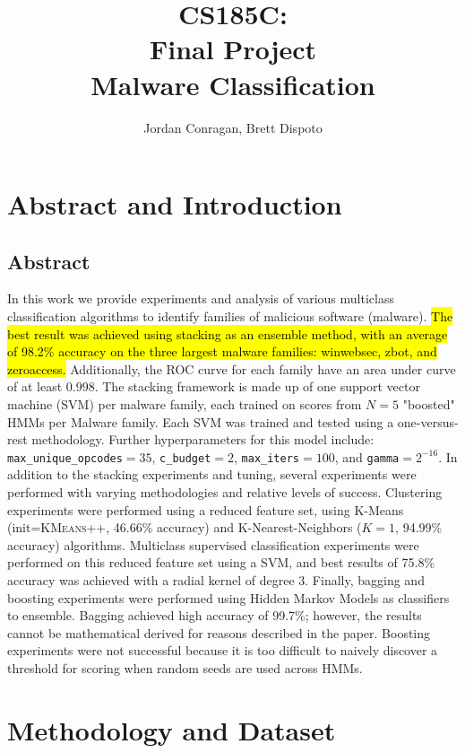 \documentclass[12pt]{article}
\title{CS185C: \\ 
Final Project \\
Malware Classification}
\author{Jordan Conragan,  Brett Dispoto}
\begin{document}
\maketitle
\tableofcontents
\newpage

\section{Abstract and Introduction}
\subsection{Abstract}
In this work we provide experiments and analysis of various multiclass classification algorithms to identify families of malicious software (malware). \hl{The best result was achieved using stacking as an ensemble method, with an average of 98.2\% accuracy on the three largest malware families:  winwebsec, zbot, and zeroaccess.} Additionally, the ROC curve for each family have an area under curve of at least $0.998$. The stacking framework is made up of one support vector machine (SVM) per malware family, each trained on scores from $N=5$ "boosted" HMMs per Malware family. Each SVM was trained and tested using a one-versus-rest methodology. Further hyperparameters for this model include: \texttt{max\_unique\_opcodes}$=35$, \texttt{c\_budget}$=2$, \texttt{max\_iters}$=100$, and \texttt{gamma}$=2^{-16}$. In addition to the stacking experiments and tuning, several experiments were performed with varying methodologies and relative levels of success. Clustering experiments were performed using a reduced feature set, using K-Means  (init=\textsc{KMeans++}, 46.66\% accuracy) and K-Nearest-Neighbors ($K=1$, 94.99\% accuracy) algorithms. Multiclass supervised classification experiments were performed on this reduced feature set using a SVM, and best results of 75.8\% accuracy was achieved with a radial kernel of degree 3. Finally, bagging and boosting experiments were performed using Hidden Markov Models as classifiers to ensemble. Bagging achieved high accuracy of 99.7\%; however, the results cannot be mathematical derived for reasons described in the paper. Boosting experiments were not successful because it is too difficult to naively discover a threshold for scoring when random seeds are used across HMMs.
\section{Methodology and Dataset}
\end{document}
